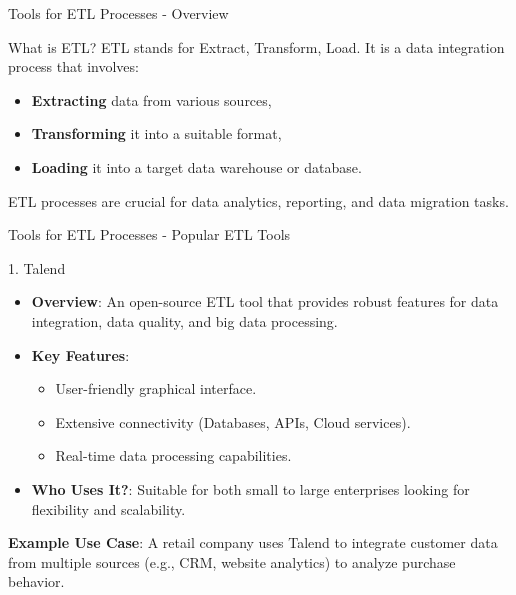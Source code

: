 \documentclass[aspectratio=169]{beamer}
\begin{document}
\begin{frame}[fragile]{Tools for ETL Processes - Overview}
  \begin{block}{What is ETL?}
    ETL stands for Extract, Transform, Load. It is a data integration process that involves:
    \begin{itemize}
      \item \textbf{Extracting} data from various sources,
      \item \textbf{Transforming} it into a suitable format,
      \item \textbf{Loading} it into a target data warehouse or database.
    \end{itemize}
    ETL processes are crucial for data analytics, reporting, and data migration tasks.
  \end{block}
\end{frame}

\begin{frame}[fragile]{Tools for ETL Processes - Popular ETL Tools}
  \begin{block}{1. Talend}
    \begin{itemize}
      \item \textbf{Overview}: An open-source ETL tool that provides robust features for data integration, data quality, and big data processing.
      \item \textbf{Key Features}:
        \begin{itemize}
          \item User-friendly graphical interface.
          \item Extensive connectivity (Databases, APIs, Cloud services).
          \item Real-time data processing capabilities.
        \end{itemize}
      \item \textbf{Who Uses It?}: Suitable for both small to large enterprises looking for flexibility and scalability.
    \end{itemize}
    \textbf{Example Use Case}: A retail company uses Talend to integrate customer data from multiple sources (e.g., CRM, website analytics) to analyze purchase behavior.
  \end{block}
\end{frame}
\end{document}
